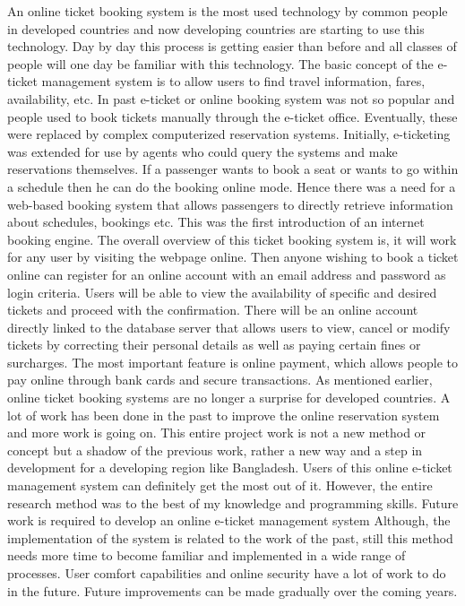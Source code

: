 \documentclass{article}
\begin{document}
    
     An online ticket booking system is the most used technology by common people in developed countries and now developing countries are starting to use this technology. Day by day this process is getting easier than before and all classes of people will one day be familiar with this technology. The basic concept of the e-ticket management system is to allow users to find travel information, fares, availability, etc. In past e-ticket or online booking system was not so popular and people used to book tickets manually through the e-ticket office. Eventually, these were replaced by complex computerized reservation systems. Initially, e-ticketing was extended for use by agents who could query the systems and make reservations themselves. If a passenger wants to book a seat or wants to go within a schedule then he can do the booking online mode. Hence there was a need for a web-based booking system that allows passengers to directly retrieve information about schedules, bookings etc. This was the first introduction of an internet booking engine. The overall overview of this ticket booking system is, it will work for any user by visiting the webpage online. Then anyone wishing to book a ticket online can register for an online account with an email address and password as login criteria. Users will be able to view the availability of specific and desired tickets and proceed with the confirmation. There will be an online account directly linked to the database server that allows users to view, cancel or modify tickets by correcting their personal details as well as paying certain fines or surcharges. The most important feature is online payment, which allows people to pay online through bank cards and secure transactions. As mentioned earlier, online ticket booking systems are no longer a surprise for developed countries. A lot of work has been done in the past to improve the online reservation system and more work is going on. This entire project work is not a new method or concept but a shadow of the previous work, rather a new way and a step in development for a developing region like Bangladesh. Users of this online e-ticket management system can definitely get the most out of it.
However, the entire research method was to the best of my knowledge and programming skills. Future work is required to develop an online e-ticket management system Although, the implementation of the system is related to the work of the past, still this method needs more time to become familiar and implemented in a wide range of processes. User comfort capabilities and online security have a lot of work to do in the future. Future improvements can be made gradually over the coming years.
\end{document}
